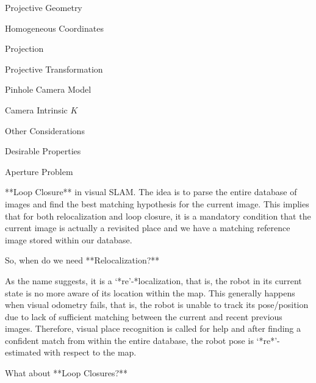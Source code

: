 \begin{section}
\begin{subsubsection}
\begin{subsubsection}
\begin{subsubsection}
\begin{section}{Projective Geometry}
\begin{subsection}{Homogeneous Coordinates}
\begin{subsubsection}
{\begin{subsubsection}{Projection}
\begin{subsubsection}{Projective Transformation}
\begin{subsection}
\begin{subsubsection}
\begin{subsubsection}
\begin{subsubsection}
{\begin{subsubsection}
\begin{subsection}
\begin{subsection} {Pinhole Camera Model}
\begin{subsection} {Camera Intrinsic $K$}
\begin{subsection}
\begin{subsection}
\begin{subsubsection}{Other Considerations}
{\begin{subsection}
\begin{subsubsection}{Desirable Properties}
\begin{section}
\begin{subsection}
\begin{subsection}
\begin{subsection}
\begin{section}
\begin{subsection}
\begin{subsubsection}
\begin{subsubsection}
\begin{subsection}
\begin{section}
\begin{subsection}
\begin{subsubsection}{Aperture Problem}
\begin{subsubsection}
{\begin{section}
\begin{subsubsection}
\begin{subsubsection}
\begin{subsubsection}
\begin{subsection}
\begin{subsection}
\begin{subsection}
\begin{subsection}
\begin{subsection}
\begin{subsection}
\begin{subsection}
\begin{subsubsection}
{\begin{subsubsection}
{\begin{subsubsection}
**Loop Closure** in visual SLAM. The idea is to parse the entire database of images and find the best matching hypothesis for the current image. This implies that for both relocalization and loop closure, it is a mandatory condition that the current image is actually a revisited place and we have a matching reference image stored within our database.

So, when do we need **Relocalization?**

As the name suggests, it is a ‘*re’-*localization, that is, the robot in its current state is no more aware of its location within the map. This generally happens when visual odometry fails, that is, the robot is unable to track its pose/position due to lack of sufficient matching between the current and recent previous images. Therefore, visual place recognition is called for help and after finding a confident match from within the entire database, the robot pose is ‘*re*’-estimated with respect to the map.

What about **Loop Closures?**


\end{subsubsection}}
\end{subsubsection}}
\end{subsubsection}
\end{subsection}
\end{subsection}
\end{subsection}
\end{subsection}
\end{subsection}
\end{subsection}
\end{subsection}
\end{subsubsection}
\end{subsubsection}
\end{subsubsection}
\end{section}}
\end{subsubsection}
\end{subsubsection}
\end{subsection}
\end{section}
\end{subsection}
\end{subsubsection}
\end{subsubsection}
\end{subsection}
\end{section}
\end{subsection}
\end{subsection}
\end{subsection}
\end{section}
\end{subsubsection}
\end{subsection}}
\end{subsubsection}
\end{subsection}
\end{subsection}
\end{subsection}
\end{subsection}
\end{subsection}
\end{subsubsection}}
\end{subsubsection}
\end{subsubsection}
\end{subsubsection}
\end{subsection}
\end{subsubsection}
\end{subsubsection}}
\end{subsubsection}
\end{subsection}
\end{section}
\end{subsubsection}
\end{subsubsection}
\end{subsubsection}
\end{section}
